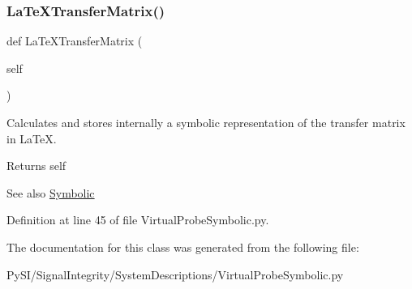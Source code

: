 \mbox{\label{classSignalIntegrity_1_1SystemDescriptions_1_1VirtualProbeSymbolic_1_1VirtualProbeSymbolic_adc83c150e43916083e3379cd4b9bb80e}} 
\subsubsection{\texorpdfstring{La\+Te\+X\+Transfer\+Matrix()}{LaTeXTransferMatrix()}}
{\footnotesize\ttfamily def La\+Te\+X\+Transfer\+Matrix (\begin{DoxyParamCaption}\item[{}]{self }\end{DoxyParamCaption})}



Calculates and stores internally a symbolic representation of the transfer matrix in La\+TeX. 

\begin{DoxyReturn}{Returns}
self 
\end{DoxyReturn}
\begin{DoxySeeAlso}{See also}
\hyperlink{namespaceSignalIntegrity_1_1SystemDescriptions_1_1Symbolic}{Symbolic} 
\end{DoxySeeAlso}


Definition at line 45 of file Virtual\+Probe\+Symbolic.\+py.



The documentation for this class was generated from the following file\+:\begin{DoxyCompactItemize}
\item 
Py\+S\+I/\+Signal\+Integrity/\+System\+Descriptions/Virtual\+Probe\+Symbolic.\+py\end{DoxyCompactItemize}
